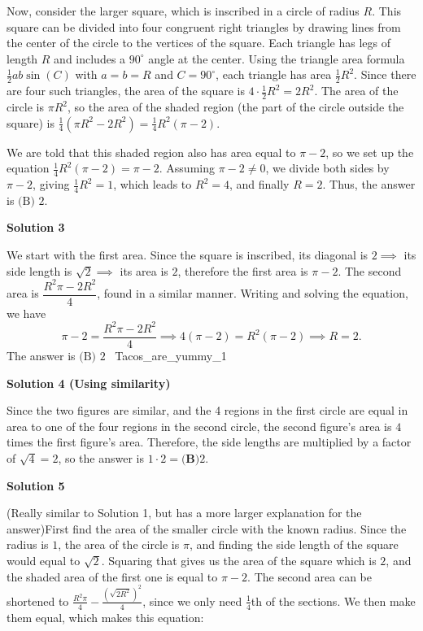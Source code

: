 \begin{enumerate}
 Now, consider the larger square, which is inscribed in a circle of radius $R$. This square can be divided into four congruent right triangles by drawing lines from the center of the circle to the vertices of the square. Each triangle has legs of length $R$ and includes a $90^\circ$ angle at the center. Using the triangle area formula $\frac{1}{2}ab\sin(C)$ with $a = b = R$ and $C = 90^\circ$, each triangle has area $\frac{1}{2}R^2$. Since there are four such triangles, the area of the square is $4 \cdot \frac{1}{2}R^2 = 2R^2$. The area of the circle is $\pi R^2$, so the area of the shaded region (the part of the circle outside the square) is $\frac{1}{4}(\pi R^2 - 2R^2) = \frac{1}{4}R^2(\pi - 2)$.

 We are told that this shaded region also has area equal to $\pi - 2$, so we set up the equation $\frac{1}{4}R^2(\pi - 2) = \pi - 2$. Assuming $\pi - 2 \neq 0$, we divide both sides by $\pi - 2$, giving $\frac{1}{4}R^2 = 1$, which leads to $R^2 = 4$, and finally $R = 2$. Thus, the answer is $\boxed{\text{(B) } 2}$.

 



\textbf{Solution 3}

We start with the first area. Since the square is inscribed, its diagonal is $2\implies$ its side length is $\sqrt{2}\implies$ its area is $2$, therefore the first area is $\pi-2$. The second area is $\dfrac{R^2\pi-2R^2}{4}$, found in a similar manner. Writing and solving the equation, we have 
 \[\pi-2=\dfrac{R^2\pi-2R^2}{4}\implies4(\pi-2)=R^2(\pi-2)\implies R=2.\]The answer is $\boxed{\text{(B) }2}$ ~Tacos\_are\_yummy\_1

 



\textbf{Solution 4 (Using similarity)}

Since the two figures are similar, and the 4 regions in the first circle are equal in area to one of the four regions in the second circle, the second figure's area is $4$ times the first figure's area. Therefore, the side lengths are multiplied by a factor of $\sqrt{4} = 2$, so the answer is $1 \cdot 2 = \boxed{\textbf{(B)} 2}$.

 



\textbf{Solution 5}

(Really similar to Solution 1, but has a more larger explanation for the answer)First find the area of the smaller circle with the known radius. Since the radius is $1$, the area of the circle is $\pi$, and finding the side length of the square would equal to $\sqrt{2}$. Squaring that gives us the area of the square which is $2$, and the shaded area of the first one is equal to $\pi - 2$. The second area can be shortened to $\frac{R^2\pi}{4} - \frac{\left(\sqrt{2R^2}\right)^2}{4}$, since we only need $\frac{1}{4}$th of the sections. We then make them equal, which makes this equation:


\end{enumerate}
